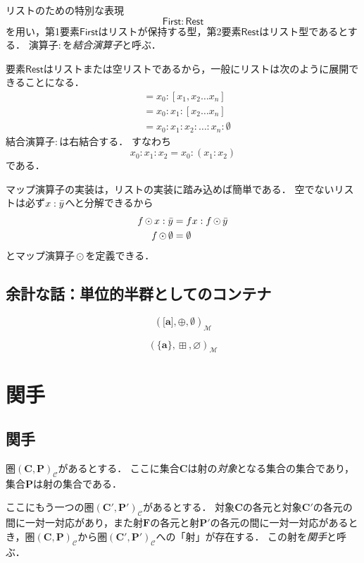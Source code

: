 \documentclass[twocolumn]{jsbook}
\newcommand{\hsklType}[1]{\textbf{#1}}
\DeclareMathOperator{\hsklMap}{\odot}
\DeclareMathOperator{\hsklMaybeAppend}{\boxplus}
\newcommand{\hsklAppend}{\oplus}
\newcommand{\hsklEmptyList}{\emptyset}
\newcommand{\hsklNothing}{\varnothing}
\newcommand{\hsklList}[1]{\Bar{#1}}
\newcommand{\hsklListType}[1]{\boldsymbol{[}#1\boldsymbol{]}}
\newcommand{\hsklMaybeType}[1]{\boldsymbol{\{}#1\boldsymbol{\}}}
\newcommand{\mathVarKeyword}[1]{\mathsf{#1}}
\newcommand{\mathFirst}{\mathVarKeyword{First}}
\newcommand{\mathRest}{\mathVarKeyword{Rest}}
\newcommand{\mathSet}[1]{\mathbf{#1}}
\newcommand{\mathCategoryShort}[2]{(#1,#2)_\mathcal{C}}
\newcommand{\mathMonoid}[3]{(#1,#2,#3)_\mathcal{M}}
\newcommand{\keyword}[1]{\emph{#1}}
\newcommand{\rangedots}{\dots}
\begin{document}
リストのための特別な表現$$\mathFirst:\mathRest$$を用い，第1要素$\mathFirst$はリストが保持する型，第2要素$\mathRest$はリスト型であるとする．
演算子$:$を\keyword{結合演算子}と呼ぶ．

要素$\mathRest$はリストまたは空リストであるから，一般にリストは次のように展開できることになる．
\begin{align*}
[x_0,x_1,x_2\rangedots x_n]&=x_0:[x_1,x_2\rangedots x_n]\\
&=x_0:x_1:[x_2\rangedots x_n]\\
&=x_0:x_1:x_2:\dots:x_n:\hsklEmptyList
\end{align*}
結合演算子$:$は右結合する．
すなわち$$x_0:x_1:x_2=x_0:(x_1:x_2)$$である．

マップ演算子の実装は，リストの実装に踏み込めば簡単である．
空でないリストは必ず$x:\hsklList{y}$へと分解できるから
\begin{align*}
f\hsklMap x:\hsklList{y}&=fx:f\hsklMap\hsklList{y}\\
f\hsklMap\hsklEmptyList&=\hsklEmptyList
\end{align*}
とマップ演算子$\hsklMap$を定義できる．

\section*{余計な話：単位的半群としてのコンテナ}

$$\mathMonoid{\hsklListType{\hsklType{a}}}{\hsklAppend}{\hsklEmptyList}$$

$$\mathMonoid{\hsklMaybeType{\hsklType{a}}}{\hsklMaybeAppend}{\hsklNothing}$$





\chapter{関手}

\section{関手}

圏$\mathCategoryShort{\mathSet{C}}{\mathSet{P}}$があるとする．
ここに集合$\mathSet{C}$は射の\keyword{対象}となる集合の集合であり，集合$\mathSet{P}$は射の集合である．

ここにもう一つの圏$\mathCategoryShort{\mathSet{C}'}{\mathSet{P}'}$があるとする．
対象$\mathSet{C}$の各元と対象$\mathSet{C}'$の各元の間に一対一対応があり，また射$\mathSet{F}$の各元と射$\mathSet{P}'$の各元の間に一対一対応があるとき，圏$\mathCategoryShort{\mathSet{C}}{\mathSet{P}}$から圏$\mathCategoryShort{\mathSet{C}'}{\mathSet{P}'}$への「射」が存在する．
この射を\keyword{関手}と呼ぶ．
\end{document}
